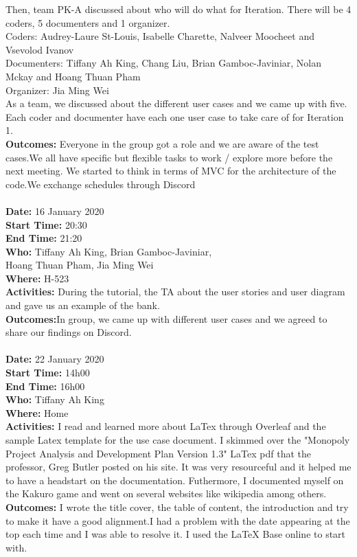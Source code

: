 \documentclass[12pt]{article}
\begin{document}
Then, team PK-A discussed about who will do what for Iteration. There will be 4 coders, 5 documenters and 1 organizer. \\

Coders: Audrey-Laure St-Louis, Isabelle Charette, Nalveer Moocheet and Vsevolod Ivanov\\
Documenters: Tiffany Ah King, Chang Liu, Brian Gamboc-Javiniar, Nolan Mckay and  Hoang Thuan Pham\\

Organizer: Jia Ming Wei\\

As a team, we discussed about the different user cases and we came up with five. Each coder and documenter have each one user case to take care of for Iteration 1. 
\\

{\bf Outcomes:} Everyone in the group got a role and we are aware of the test cases.We all have specific but flexible tasks to work / explore more before the next meeting. We started to think in terms of MVC for the architecture of the code.We exchange schedules through Discord\\\\

{\bf Date:} 16 January 2020\\
{\bf Start Time:} 20:30\\
{\bf End Time:} 21:20\\
{\bf Who:} Tiffany Ah King, Brian Gamboc-Javiniar,\\
 Hoang Thuan Pham, Jia Ming Wei\\
{\bf Where:} H-523\\
{\bf Activities:} During the tutorial, the TA about the user stories and user diagram and gave us an example of the bank.\\
{\bf Outcomes:}In group, we came up with different user cases and we agreed to share our findings on Discord.\\ \\


{\bf Date:} 22 January 2020\\
{\bf Start Time:} 14h00\\
{\bf End Time:} 16h00\\
{\bf Who:} Tiffany Ah King\\
{\bf Where:} Home\\
{\bf Activities:} I read and learned more about LaTex through Overleaf and the sample Latex template for the use case document. I skimmed over the "Monopoly Project Analysis and Development Plan Version 1.3" LaTex pdf that the professor, Greg Butler posted on his site. It was very resourceful and it helped me to have a headstart on the documentation. Futhermore, I documented myself on the Kakuro game and went on several websites like wikipedia among others.\\
{\bf Outcomes:} I wrote the title cover, the table of content, the introduction and try to make it have a good alignment.I had a problem with the date appearing at the top each time and I was able to resolve it. I used the LaTeX Base online to start with.\\ \\
\end{document}
